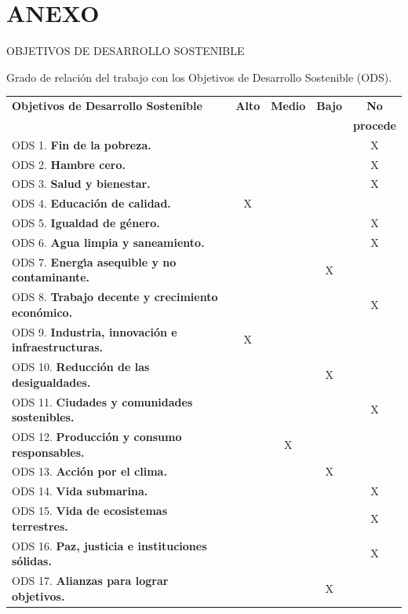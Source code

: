 \documentclass[11pt]{article}
\begin{document}
\phantom{x}

\vspace{1ex}

\section*{ANEXO}

\vspace{2ex}

OBJETIVOS DE DESARROLLO SOSTENIBLE

\vspace{4ex}

Grado de relaci\'on del trabajo con los Objetivos de Desarrollo Sostenible (ODS).

\vspace{2ex}

\begin{tabular}{|l|c|c|c|c|}\hline
\textbf{Objetivos de Desarrollo Sostenible} & \textbf{Alto} & \textbf{Medio} & \textbf{Bajo} & \textbf{No} \\
& & & & \textbf{procede} \\ \hline
ODS 1.  \textbf{Fin de la pobreza.}                            & & & & X \\ \hline
ODS 2.  \textbf{Hambre cero.}                                  & & & & X \\ \hline
ODS 3.  \textbf{Salud y bienestar.}                            & & & & X \\ \hline
ODS 4.  \textbf{Educaci\'on de calidad.}                       & X & & & \\ \hline
ODS 5.  \textbf{Igualdad de g\'enero.}                         & & & & X \\ \hline
ODS 6.  \textbf{Agua limpia y saneamiento.}                    & & & & X \\ \hline
ODS 7.  \textbf{Energ\'{\i}a asequible y no contaminante.}     & & & X & \\ \hline
ODS 8.  \textbf{Trabajo decente y crecimiento econ\'omico.}    & & & & X \\ \hline
ODS 9.  \textbf{Industria, innovaci\'on e infraestructuras.}   & X & & & \\ \hline
ODS 10. \textbf{Reducci\'on de las desigualdades.}             & & & X & \\ \hline
ODS 11. \textbf{Ciudades y comunidades sostenibles.}           & & & & X \\ \hline
ODS 12. \textbf{Producci\'on y consumo responsables.}          & & X & & \\ \hline
ODS 13. \textbf{Acci\'on por el clima.}                        & & & X & \\ \hline
ODS 14. \textbf{Vida submarina.}                               & & & & X \\ \hline
ODS 15. \textbf{Vida de ecosistemas terrestres.}               & & & & X \\ \hline
ODS 16. \textbf{Paz, justicia e instituciones s\'olidas.}      & & & & X \\ \hline
ODS 17. \textbf{Alianzas para lograr objetivos.}               & & & X & \\ \hline
\end{tabular}
\end{document}

